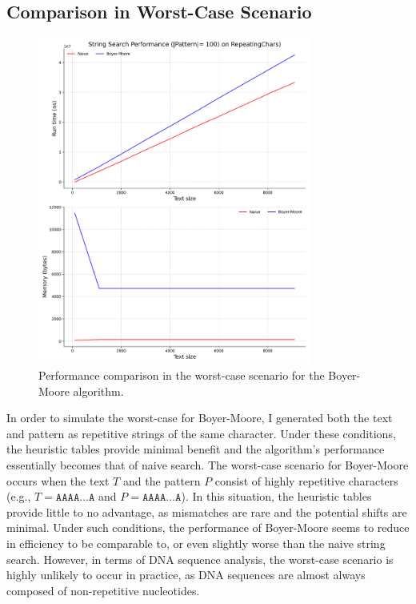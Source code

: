 \documentclass[11pt, letterpaper]{article}
\begin{document}
\subsection{Comparison in Worst-Case Scenario}
\begin{figure}[H]
  \centering
  \includegraphics[width=0.8\textwidth]{worstcase_search.png}
  \caption{Performance comparison in the worst-case scenario for the Boyer-Moore algorithm.}
  \label{fig:worstcase}
\end{figure}
\FloatBarrier
\flushleft
In order to simulate the worst-case for Boyer-Moore, I generated both the text and pattern as repetitive strings of the same character.
Under these conditions, the heuristic tables provide minimal benefit and the algorithm's performance essentially becomes that of naive search. 
The worst-case scenario for Boyer-Moore occurs when the text $T$ and the pattern $P$ consist of highly repetitive characters (e.g., $T = \mathtt{AAAA\ldots A}$ and $P = \mathtt{AAAA\ldots A}$).
In this situation, the heuristic tables provide little to no advantage, as mismatches are rare and the potential shifts are minimal. 
Under such conditions, the performance of Boyer-Moore seems to reduce in efficiency to be comparable to, or even slightly worse than the naive string search. 
However, in terms of DNA sequence analysis, the worst-case scenario is highly unlikely to occur in practice, as DNA sequences are almost always composed of non-repetitive nucleotides.
\end{document}
